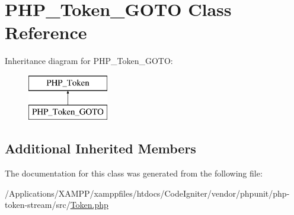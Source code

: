 \hypertarget{class_p_h_p___token___g_o_t_o}{}\section{P\+H\+P\+\_\+\+Token\+\_\+\+G\+O\+TO Class Reference}
\label{class_p_h_p___token___g_o_t_o}
Inheritance diagram for P\+H\+P\+\_\+\+Token\+\_\+\+G\+O\+TO\+:\begin{figure}[H]
\begin{center}
\leavevmode
\includegraphics[height=2.000000cm]{class_p_h_p___token___g_o_t_o}
\end{center}
\end{figure}
\subsection*{Additional Inherited Members}


The documentation for this class was generated from the following file\+:\begin{DoxyCompactItemize}
\item 
/\+Applications/\+X\+A\+M\+P\+P/xamppfiles/htdocs/\+Code\+Igniter/vendor/phpunit/php-\/token-\/stream/src/\mbox{\hyperlink{_token_8php}{Token.\+php}}\end{DoxyCompactItemize}
